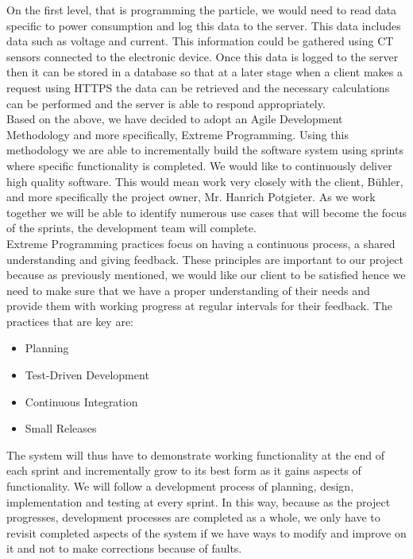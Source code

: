 \documentclass{scrartcl}
\begin{document}
On the first level, that is programming the particle, we would need to read data specific to power consumption and log this data to the server. This data includes data such as voltage and current. This information could be gathered using CT sensors connected to the electronic device. Once this data is logged to the server then it can be stored in a database so that at a later stage when a client makes a request using HTTPS the data can be retrieved and the necessary calculations can be performed and the server is able to respond appropriately. \\

Based on the above, we have decided to adopt an Agile Development Methodology and more specifically, Extreme Programming. Using this methodology we are able to incrementally build the software system using sprints where specific functionality is completed. We would like to continuously deliver high quality software. This would mean work very closely with the client, B{\"u}hler, and more specifically the project owner, Mr. Hanrich Potgieter. As we work together we will be able to identify numerous use cases that will become the focus of the sprints, the development team will complete. \\

Extreme Programming practices focus on having a continuous process, a shared understanding and giving feedback. These principles are important to our project because as previously mentioned, we would like our client to be satisfied hence we need to make sure that we have a proper understanding of their needs and provide them with working progress at regular intervals for their feedback. The practices that are key are:
\begin{itemize}
\item Planning
\item Test-Driven Development
\item Continuous Integration
\item Small Releases
\end{itemize}
The system will thus have to demonstrate working functionality at the end of each sprint and incrementally grow to its best form as it gains aspects of functionality. We will follow a development process of planning, design, implementation and testing at every sprint. In this way, because as the project progresses, development processes are completed as a whole, we only have to revisit completed aspects of the system if we have ways to modify and improve on it and not to make corrections because of faults.\\
\end{document}
